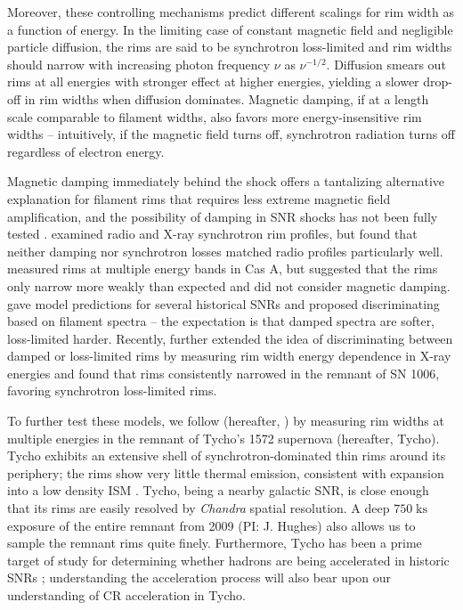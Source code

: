 \documentclass[iop, apj, numberedappendix]{emulateapj}
\newcommand*{\mt}{\mathrm}
\newcommand*{\unit}[1]{\;\mt{#1}}  %
\begin{document}
Moreover, these controlling mechanisms predict different scalings for rim width
as a function of energy.  In the limiting case of constant magnetic field and
negligible particle diffusion, the rims are said to be synchrotron loss-limited
and rim widths should narrow with increasing photon frequency $\nu$ as
$\nu^{-1/2}$. Diffusion smears out rims at all energies with stronger effect at
higher energies, yielding a slower drop-off in rim widths when diffusion
dominates.  Magnetic damping, if at a length scale comparable to filament
widths, also favors more energy-insensitive rim widths -- intuitively, if the
magnetic field turns off, synchrotron radiation turns off regardless of
electron energy.

Magnetic damping immediately behind the shock offers a tantalizing alternative
explanation for filament rims that requires less extreme magnetic field
amplification, and the possibility of damping in SNR shocks has not been fully
tested \citep{pohl2005, marcowith2010}.  \citet{cassam-chenai2007} examined
radio and X-ray synchrotron rim profiles, but found that neither damping nor
synchrotron losses matched radio profiles particularly well.  \citet{araya2010}
measured rims at multiple energy bands in Cas A, but suggested that the rims
only narrow more weakly than expected and did not consider magnetic damping.
\citet{rettig2012} gave model predictions for several historical SNRs and
proposed discriminating based on filament spectra -- the expectation is that
damped spectra are softer, loss-limited harder.  Recently, \citet{ressler2014}
further extended the idea of discriminating between damped or loss-limited
rims by measuring rim width energy dependence in X-ray energies and found that
rims consistently narrowed in the remnant of SN 1006, favoring synchrotron
loss-limited rims.

To further test these models, we follow \citet{ressler2014} (hereafter,
) by measuring rim widths at multiple energies in the
remnant of Tycho's 1572 supernova (hereafter, Tycho).  Tycho exhibits an
extensive shell of synchrotron-dominated thin rims around its periphery; the
rims show very little thermal emission, consistent with expansion into a low
density ISM \citet{williams2013}.  Tycho, being a nearby galactic SNR, is close
enough that its rims are easily resolved by \textit{Chandra} spatial
resolution. A deep $750 \unit{ks}$ exposure of the entire remnant from 2009
(PI: J. Hughes) also allows us to sample the remnant rims quite finely.
Furthermore, Tycho has been a prime target of study for determining whether
hadrons are being accelerated in historic SNRs \citep[and references
therein]{morlino2012}; understanding the acceleration process will also bear
upon our understanding of CR acceleration in Tycho.
\end{document}
